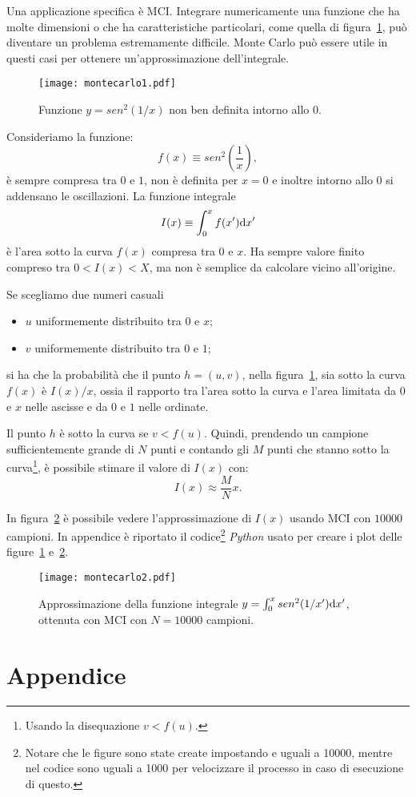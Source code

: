 Una
applicazione specifica \`e \ac{MCI}. Integrare numericamente una
funzione che ha
molte dimensioni o che ha caratteristiche particolari, come quella di
figura~\ref{fig:func}, pu\`o diventare un problema estremamente
difficile. Monte Carlo pu\`o essere utile in questi casi per ottenere
un'approssimazione dell'integrale.
\begin{figure}[h!]
  \centering
  \texttt{[image: montecarlo1.pdf]}
  \caption{Funzione $y=sen^2(1/x)$ non ben definita intorno allo $0$.}
  \label{fig:func}
\end{figure}

Consideriamo la funzione:
\begin{equation*}
  f(x)\equiv sen^2(\frac{1}{x}),
\end{equation*}
\`e sempre compresa tra $0$ e $1$, non \`e definita per
$x=0$ e inoltre intorno allo $0$ si addensano le oscillazioni. La
funzione integrale
\begin{equation*}
  I(x) \equiv \int_0^x f(x') \mathrm{d} x'
\end{equation*}
\`e l'area sotto la curva $f(x)$ compresa tra $0$ e $x$. Ha sempre valore finito
compreso tra $0<I(x)<X$, ma non \`e semplice da calcolare vicino
all'origine.

Se scegliamo due numeri casuali
\begin{itemize}
\item  $u$ uniformemente distribuito tra $0$ e $x$;
\item $v$ uniformemente distribuito tra $0$ e $1$;
\end{itemize}
si ha che la probabilit\`a che il punto $h = (u, v)$, nella
figura~\ref{fig:func}, sia sotto la curva 
$f(x)$ \`e $I(x)/x$, ossia il rapporto tra l'area sotto la curva e
l'area limitata da $0$ e $x$ nelle
ascisse e da $0$ e $1$ nelle ordinate.

Il punto $h$ \`e sotto la
curva se $v<f(u)$. Quindi, prendendo un campione sufficientemente
grande di $N$ punti e contando gli $M$ punti che stanno sotto la
curva\footnote{Usando la disequazione $v<f(u)$.}, \`e possibile
stimare il valore di $I(x)$ con:
\begin{equation*}
  I(x)\approx \frac{M}{N}x.
\end{equation*}

In figura~\ref{fig:int} \`e possibile vedere l'approssimazione di
$I(x)$ usando \ac{MCI} con $10000$ campioni. In appendice \`e
riportato il codice\footnote{Notare che le figure
  sono state create impostando  e 
  uguali a 10000, mentre nel codice sono uguali a 1000 per velocizzare
  il processo in caso di esecuzione di questo.} \emph{Python} usato
per creare i plot delle
figure~\ref{fig:func} e~\ref{fig:int}.
\begin{figure}[h!]
  \centering
  \texttt{[image: montecarlo2.pdf]}
  \caption{Approssimazione della funzione integrale $y=\int_0^x sen^2(1/x')\mathrm{d} x'$, ottenuta
    con \ac{MCI} con $N=10000$ campioni.}
  \label{fig:int}
\end{figure}

\newpage
\section{Appendice}


